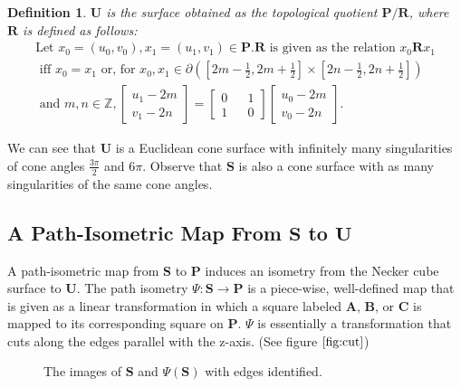 \documentclass[]{article}
\newtheorem{Def}{Definition}[subsection]
\begin{document}
\begin{Def}{} $\mathbf U$ is the surface obtained as the topological quotient $\mathbf P/\mathbf R$, where $\mathbf R$ is defined as follows:
\begin{gather*}
\text{Let } x_{0}=(u_{0},v_{0}),x_{1}=(u_{1},v_{1}) \in \mathbf{P}.  \mathbf{ R} \text { is given as the relation } x_{0}\mathbf{R}x_{1} \\ \text{ iff } x_{0}=x_{1}
 \text{ or, for }x_{0},x_{1} \in {\partial} \left( \left[2m-\frac{1}{2},2m+\frac{1}{2}\right] \times \left[2n-\frac{1}{2},2n+\frac{1}{2}\right] \right)\\
 \text{ and }m,n\in\mathbb{Z},
  \left[\begin{array}{c}
u_{1} -2m
\\v_{1}-2n
\end{array}\right] = \left[\begin{matrix}
0 && 1\\
1 && 0
\end{matrix}\right]
\left[ \begin{array}{c}u_{0}-2m\\
v_{0}-2n
\end{array}\right]
. \end{gather*}
\end{Def}

We can see that $\mathbf{U}$ is a Euclidean cone surface with infinitely many singularities of cone angles $\frac{3\pi}{2}$ and $6\pi$. Observe that $\mathbf{S}$ is also a cone surface with as many singularities of the same cone angles.

\subsection{A Path-Isometric Map From $\mathbf S$ to $\mathbf U$}
A path-isometric map from $\mathbf{S}$ to $\mathbf{P}$ induces an isometry from the Necker cube surface to $\mathbf{U}$. The path isometry $\Psi:\mathbf{S}\rightarrow\mathbf{P}$ is a piece-wise, well-defined map that is given as a linear transformation in which a square labeled $\mathbf{A}$, $\mathbf{B}$, or $\mathbf{C}$ is mapped to its corresponding square on $\mathbf{P}$. $\Psi$ is  essentially a transformation that cuts along the edges parallel with the z-axis. (See figure $\ref{fig:cut}$)

\begin{figure}[H]

\raisebox{0.4in}{}
\caption{The images of $\mathbf S$ and $\Psi(\mathbf{S})$ with edges identified.}
\label{fig:cut}
\end{figure}
\end{document}
